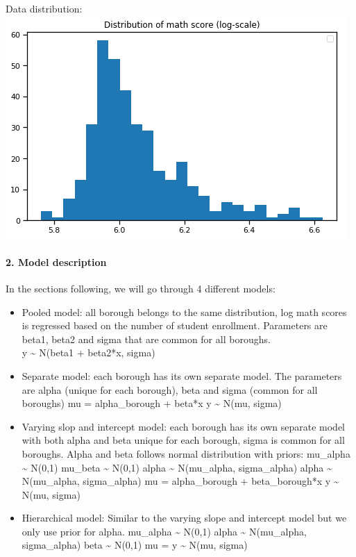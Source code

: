 \documentclass[11pt]{article}
\makeatletter
\def\maxwidth{\ifdim\Gin@nat@width>\linewidth\linewidth
    \else\Gin@nat@width\fi}
\let\Oldincludegraphics\includegraphics
\renewcommand{\includegraphics}[1]{\Oldincludegraphics[width=.8\maxwidth]{#1}}
\providecommand{\tightlist}{%
      \setlength{\itemsep}{0pt}\setlength{\parskip}{0pt}}
\makeatother
\begin{document}
Data distribution: \includegraphics{./Fig/nyc/Math.png}

\paragraph{2. Model description}\label{model-description}

In the sections following, we will go through 4 different models:

\begin{itemize}
\tightlist
\item
  Pooled model: all borough belongs to the same distribution, log math
  scores is regressed based on the number of student enrollment.
  Parameters are beta1, beta2 and sigma that are common for all
  boroughs.\\
  y \textasciitilde{} N(beta1 + beta2*x, sigma)
\item
  Separate model: each borough has its own separate model. The
  parameters are alpha (unique for each borough), beta and sigma (common
  for all boroughs) mu = alpha\_borough + beta*x y \textasciitilde{}
  N(mu, sigma)
\item
  Varying slop and intercept model: each borough has its own separate
  model with both alpha and beta unique for each borough, sigma is
  common for all boroughs. Alpha and beta follows normal distribution
  with priors: mu\_alpha \textasciitilde{} N(0,1) mu\_beta
  \textasciitilde{} N(0,1) alpha \textasciitilde{} N(mu\_alpha,
  sigma\_alpha) alpha \textasciitilde{} N(mu\_alpha, sigma\_alpha) mu =
  alpha\_borough + beta\_borough*x y \textasciitilde{} N(mu, sigma)
\item
  Hierarchical model: Similar to the varying slope and intercept model
  but we only use prior for alpha. mu\_alpha \textasciitilde{} N(0,1)
  alpha \textasciitilde{} N(mu\_alpha, sigma\_alpha) beta
  \textasciitilde{} N(0,1) mu = y \textasciitilde{} N(mu, sigma)
\end{itemize}
\end{document}
